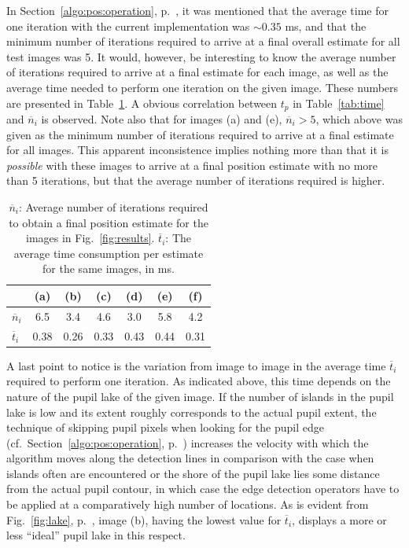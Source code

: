 In Section~\ref{algo:pos:operation}, p.~\pageref{pg:iterationtime}, it
was mentioned that the average time for one iteration with the current
implementation was $\sim 0.35$ ms, and that the minimum number of
iterations required to arrive at a final overall estimate for all test
images was 5.  It would, however, be interesting to know the average
number of iterations required to arrive at a final estimate for each
image, as well as the average time needed to perform one iteration on
the given image.  These numbers are presented in
Table~\ref{tab:iterations}.  A obvious correlation between $t_{p}$ in
Table~\ref{tab:time} and $\overline{n}_{i}$ is observed.  Note also
that for images (a) and (e), $\overline{n}_{i}>5$, which above was
given as the minimum number of iterations required to arrive at a
final estimate for all images.  This apparent inconsistence implies
nothing more than that it is {\em possible\/} with these images to
arrive at a final position estimate with no more than 5 iterations,
but that the average number of iterations required is higher.

\begin{table}[tb]
  \begin{center}
    \begin{tabular}{|l||c|c|c|c|c|c|}                           \hline
                         & (a) & (b) & (c) & (d) & (e) & (f) \\ \hline\hline
      $\overline{n}_{i}$ & 6.5  & 3.4  & 4.6  & 3.0  & 5.8  & 4.2  \\ \hline
      $\overline{t}_{i}$ & 0.38 & 0.26 & 0.33 & 0.43 & 0.44 & 0.31 \\ \hline
    \end{tabular}
  \end{center}
  \caption{\label{tab:iterations}$\overline{n}_{i}$: Average number of
    iterations required to obtain a final position estimate for the
    images in Fig.~\protect\ref{fig:results}.  $\overline{t}_{i}$: The
    average time consumption per estimate for the same images, in ms.}
\end{table}

A last point to notice is the variation from image to image in the
average time $\overline{t}_{i}$ required to perform one iteration.  As
indicated above, this time depends on the nature of the pupil lake of
the given image.  If the number of islands in the pupil lake is low
and its extent roughly corresponds to the actual pupil extent, the
technique of skipping pupil pixels when looking for the pupil edge
(cf.\ Section~\ref{algo:pos:operation},
p.~\pageref{pg:skiplakepixels}) increases the velocity with which the
algorithm moves along the detection lines in comparison with the case
when islands often are encountered or the shore of the pupil lake lies
some distance from the actual pupil contour, in which case the edge
detection operators have to be applied at a comparatively high number
of locations.  As is evident from Fig.~\ref{fig:lake},
p.~\pageref{fig:lake}, image (b), having the lowest value for
$\overline{t}_{i}$, displays a more or less ``ideal'' pupil lake in
this respect.

